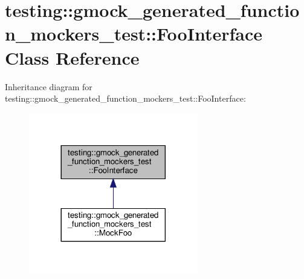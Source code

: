 \hypertarget{classtesting_1_1gmock__generated__function__mockers__test_1_1_foo_interface}{}\section{testing\+:\+:gmock\+\_\+generated\+\_\+function\+\_\+mockers\+\_\+test\+:\+:Foo\+Interface Class Reference}
\label{classtesting_1_1gmock__generated__function__mockers__test_1_1_foo_interface}


Inheritance diagram for testing\+:\+:gmock\+\_\+generated\+\_\+function\+\_\+mockers\+\_\+test\+:\+:Foo\+Interface\+:
\nopagebreak
\begin{figure}[H]
\begin{center}
\leavevmode
\includegraphics[width=209pt]{classtesting_1_1gmock__generated__function__mockers__test_1_1_foo_interface__inherit__graph}
\end{center}
\end{figure}
